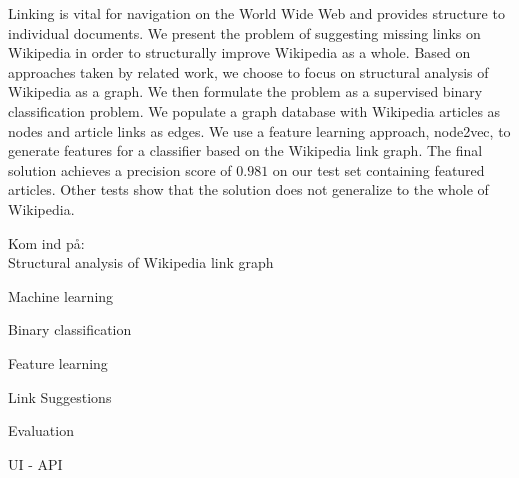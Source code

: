 Linking is vital for navigation on the World Wide Web and provides structure to individual documents. We present the problem of suggesting missing links on Wikipedia in order to structurally improve Wikipedia as a whole. Based on approaches taken by related work, we choose to focus on structural analysis of Wikipedia as a graph. We then formulate the problem as a supervised binary classification problem. We populate a graph database with Wikipedia articles as nodes and article links as edges. We use a feature learning approach, node2vec, to generate features for a classifier based on the Wikipedia link graph. The final solution achieves a precision score of $0.981$ on our test set containing featured articles. Other tests show that the solution does not generalize to the whole of Wikipedia.


Kom ind på:\\
Structural analysis of Wikipedia link graph

Machine learning

Binary classification

Feature learning

Link Suggestions

Evaluation

UI - API